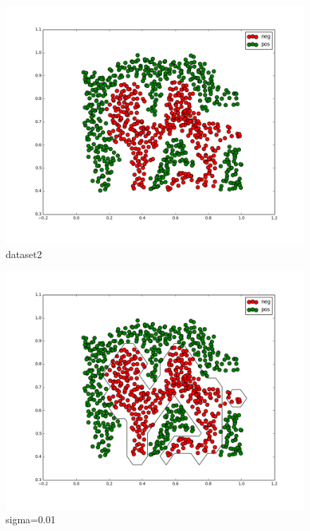 \documentclass[pdftex,11pt]{article}
\begin{document}
 \begin{figure}[H]
  \caption{dataset2}
  \centering
    \includegraphics[scale=0.5]{dataset2.png}
\end{figure}

 \begin{figure}[H]
  \caption{sigma=0.01}
  \centering
    \includegraphics[scale=0.5]{sigma001.png}
\end{figure}
 
\end{document}
